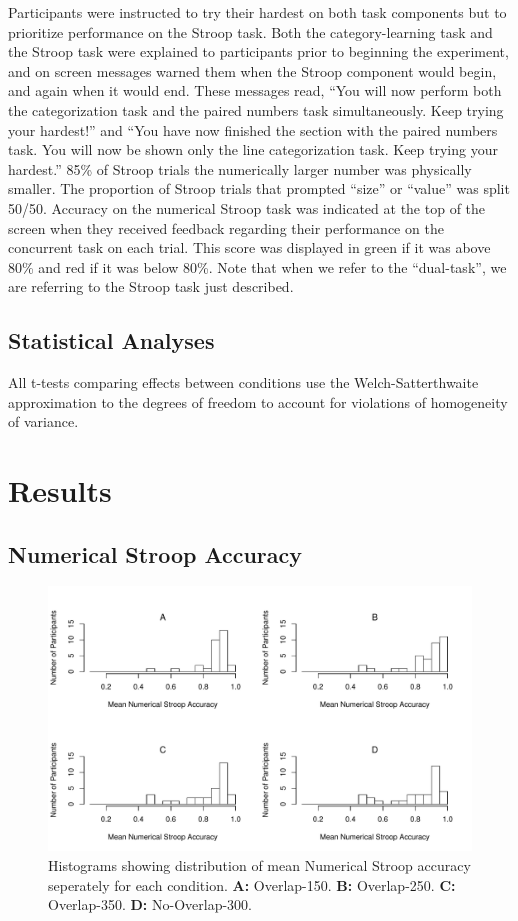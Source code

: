 \documentclass[apacite,draftfirst,man]{apa6}
\begin{document}
Participants were instructed to try their hardest on both task components but to
prioritize performance on the Stroop task. Both the category-learning task and
the Stroop task were explained to participants prior to beginning the
experiment, and on screen messages warned them when the Stroop component would
begin, and again when it would end. These messages read, ``You will now perform
both the categorization task and the paired numbers task simultaneously. Keep
trying your hardest!'' and ``You have now finished the section with the paired
numbers task. You will now be shown only the line categorization task. Keep
trying your hardest.'' 85\% of Stroop trials the numerically larger number was
physically smaller. The proportion of Stroop trials that prompted ``size'' or
``value'' was split 50/50. Accuracy on the numerical Stroop task was indicated
at the top of the screen when they received feedback regarding their performance
on the concurrent task on each trial. This score was displayed in green if it
was above 80\% and red if it was below 80\%. Note that when we refer to the
``dual-task'', we are referring to the Stroop task just described.

\subsection*{Statistical Analyses}
All t-tests comparing effects between conditions use the Welch-Satterthwaite
approximation to the degrees of freedom to account for violations of homogeneity
of variance.

\section*{Results}
\subsection*{Numerical Stroop Accuracy}
\begin{figure}[t]
\centering \includegraphics[width=1.0\textwidth]{../figures/fig_exc_dual.pdf}
\caption{ Histograms showing distribution of mean Numerical Stroop accuracy
  seperately for each condition. \textbf{A:} Overlap-150. \textbf{B:} Overlap-250.
  \textbf{C:} Overlap-350. \textbf{D:} No-Overlap-300. }
    \label{fig:exc_dual}
\end{figure}
\end{document}
